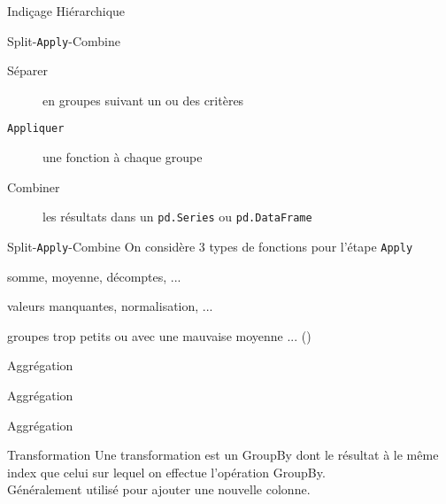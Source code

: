 \begin{frame}{Indiçage Hiérarchique}
\end{frame}

\begin{frame}{Split-\texttt{Apply}-Combine}
  \begin{description}
    \item[Séparer]   en groupes suivant un ou des critères
    \item[\texttt{Appliquer}] une fonction à chaque groupe
    \item[Combiner]  les résultats dans un \texttt{pd.Series} ou \texttt{pd.DataFrame}
  \end{description}
\end{frame}

\begin{frame}{Split-\texttt{Apply}-Combine}
  On considère 3 types de fonctions pour l'étape \texttt{Apply}
  \begin{description}[r,labelwidth=\widthof{\bfseries Transformation :}]
    \item[Agrégation :]   somme, moyenne, décomptes, ... 
    \item[Transformation :] valeurs manquantes, normalisation, ... 
    \item[Filtrage :]  groupes trop petits ou avec une mauvaise moyenne ... ()
  \end{description}
\end{frame}

\begin{frame}{Aggrégation}
\end{frame}

\begin{frame}{Aggrégation}
\end{frame}

\begin{frame}{Aggrégation}
\end{frame}

\begin{frame}{Transformation}
  Une transformation est un GroupBy dont le résultat à le même index que celui sur lequel on effectue l'opération GroupBy. \\
  Généralement utilisé pour ajouter une nouvelle colonne.
\end{frame}

